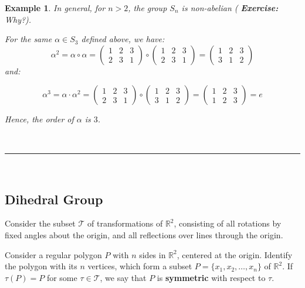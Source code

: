\documentclass[a4paper,12pt]{report}
\newcounter{statement}
\numberwithin{statement}{chapter}
\newtheorem{eg}[statement]{\bf Example}
\numberwithin{equation}{chapter}
\numberwithin{section}{chapter}
\numberwithin{subsection}{section}
\begin{document}
\begin{eg}
In general, for $n > 2$, the group $S_n$ is non-abelian ( {\bf Exercise:}  Why?).




For the same $\alpha \in S_3$ defined above, we have:
\[
\alpha^2 = \alpha\circ\alpha =
\left(\begin{matrix}
1 & 2 & 3\\
2 & 3 & 1
\end{matrix}\right)\circ
\left(\begin{matrix}
1 & 2 & 3\\
2 & 3 & 1
\end{matrix}\right) =
\left(\begin{matrix}
1 & 2 & 3\\
3 & 1 & 2
\end{matrix}\right)
\]
and:




\[
\alpha^3 = \alpha\cdot\alpha^2
= \left(\begin{matrix}
1 & 2 & 3\\
2 & 3 & 1
\end{matrix}\right)
\circ
\left(\begin{matrix}
1 & 2 & 3\\
3 & 1 & 2
\end{matrix}\right)
=
\left(\begin{matrix}
1 & 2 & 3\\
1 & 2 & 3
\end{matrix}\right) = e
\]

Hence, the order of $\alpha$ is $3$.

\end{eg}

\quad\\\hrule
\quad\\
\subsection*{Dihedral Group}

Consider the subset $\mathcal{T}$ of transformations of $\mathbb{R}^2$,
consisting of all rotations by fixed angles about the origin, and all reflections over lines through the origin.




Consider a regular polygon $P$ with $n$ sides in $\mathbb{R}^2$, centered at the origin.
Identify the polygon with its $n$ vertices, which form a subset $P = \{x_1, x_2, \ldots, x_n\}$
of $\mathbb{R}^2$.  If $\tau(P) = P$ for some $\tau \in \mathcal{T}$, we say that $P$ is  {\bf symmetric} 
with respect to $\tau$.
\end{document}
